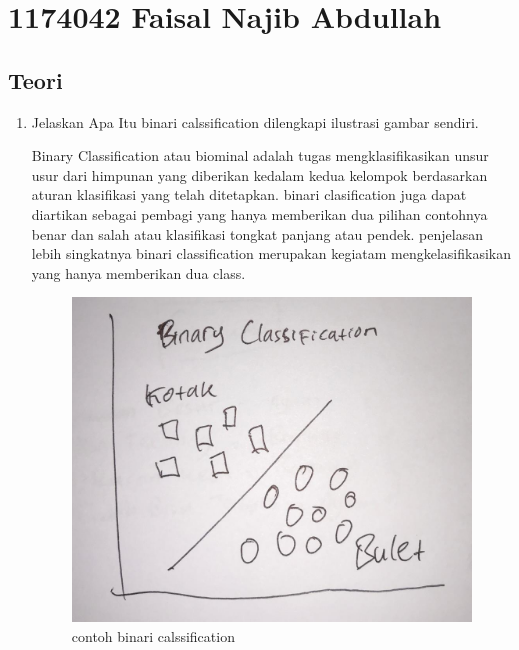 \section{1174042 Faisal Najib Abdullah}

\subsection{Teori}
\begin{enumerate}
\item Jelaskan Apa Itu binari calssification dilengkapi ilustrasi gambar sendiri.\par
Binary Classification atau biominal adalah tugas mengklasifikasikan unsur usur dari himpunan yang diberikan kedalam kedua kelompok berdasarkan aturan klasifikasi yang telah ditetapkan. binari clasification juga dapat diartikan sebagai pembagi yang hanya memberikan dua pilihan contohnya benar dan salah atau klasifikasi tongkat panjang atau pendek. penjelasan lebih singkatnya binari classification merupakan kegiatam mengkelasifikasikan yang hanya memberikan dua class.
\begin{figure}[ht]
\centering
\includegraphics[scale=0.2]{figures/1174042/chapter2/1,1.jpeg}
\caption{contoh binari calssification}
\label{contoh}
\end{figure}



\end{enumerate}
